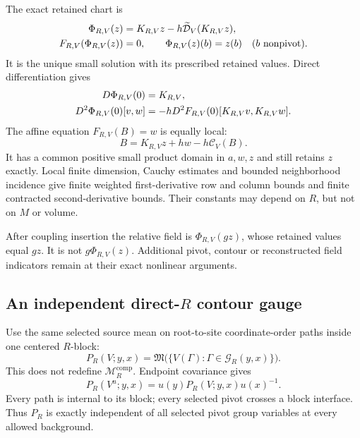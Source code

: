 The exact retained chart is
\begin{align}
 \Phi_{R,V}(z)
   &=K_{R,V}z-h\widetilde{\mathcal D}_V(K_{R,V}z),\notag\\
 F_{R,V}(\Phi_{R,V}(z))&=0,\qquad
 \Phi_{R,V}(z)(b)=z(b)\quad(b\text{ nonpivot}).
 \label{cmg-retained-chart}
\end{align}
It is the unique small solution with its prescribed retained values.
Direct differentiation gives
\begin{align}
 D\Phi_{R,V}(0)&=K_{R,V},\notag\\
 D^2\Phi_{R,V}(0)[v,w]
   &=-hD^2F_{R,V}(0)[K_{R,V}v,K_{R,V}w].
 \label{cmg-chart-derivatives}
\end{align}
The affine equation $F_{R,V}(B)=w$ is equally local:
\begin{equation}
 B=K_{R,V}z+hw-h\mathcal C_V(B).
 \label{cmg-affine-chart}
\end{equation}
It has a common positive small product domain in $a,w,z$ and still
retains $z$ exactly. Local finite dimension, Cauchy estimates and
bounded neighborhood incidence give finite weighted first-derivative
row and column bounds and finite contracted second-derivative bounds.
Their constants may depend on $R$, but not on $M$ or volume.

After coupling insertion the relative field is
$\Phi_{R,V}(gz)$, whose retained values equal $gz$.
It is not $g\Phi_{R,V}(z)$. Additional pivot, contour or reconstructed
field indicators remain at their exact nonlinear arguments.

\subsection{An independent direct-$R$ contour gauge}
\label{cmg-gauge-section}

Use the same selected source mean on root-to-site coordinate-order
paths inside one centered $R$-block:
\begin{equation}
 P_R(V;y,x)=
 \mathfrak M\bigl(\{V(\Gamma):\Gamma\in\mathcal G_R(y,x)\}\bigr).
 \label{cmg-direct-contour}
\end{equation}
This does not redefine $\mathcal M_R^{\mathrm{comp}}$. Endpoint
covariance gives
\begin{equation}
 P_R(V^u;y,x)=u(y)P_R(V;y,x)u(x)^{-1}.
 \label{cmg-direct-covariance}
\end{equation}
Every path is internal to its block; every selected pivot crosses a
block interface. Thus $P_R$ is exactly independent of all selected
pivot group variables at every allowed background.

